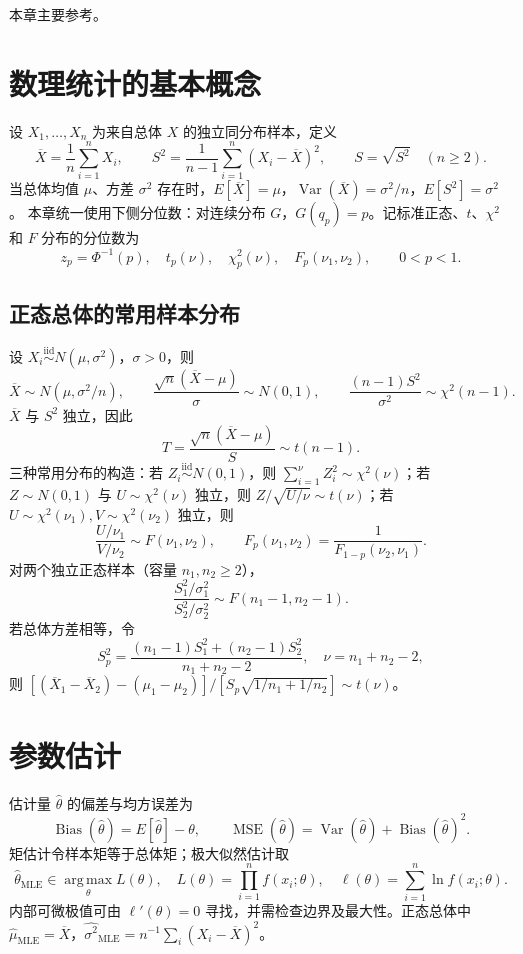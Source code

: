 \documentclass[../main.tex]{subfiles}
\begin{document}
本章主要参考\cite{wasserman}。

\section{数理统计的基本概念}
设 $X_1,\ldots,X_n$ 为来自总体 $X$ 的独立同分布样本，定义
\[
\overline X=\frac1n\sum_{i=1}^nX_i,\qquad
S^2=\frac1{n-1}\sum_{i=1}^n(X_i-\overline X)^2,\qquad S=\sqrt{S^2}\quad(n\ge2).
\]
当总体均值 $\mu$、方差 $\sigma^2$ 存在时，$E[\overline X]=\mu$，$\operatorname{Var}(\overline X)=\sigma^2/n$，$E[S^2]=\sigma^2$。
本章统一使用下侧分位数：对连续分布 $G$，$G(q_p)=p$。记标准正态、$t$、$\chi^2$ 和 $F$ 分布的分位数为
\[
z_p=\Phi^{-1}(p),\quad t_p(\nu),\quad\chi^2_p(\nu),\quad F_p(\nu_1,\nu_2),\qquad0<p<1.
\]
\subsection{正态总体的常用样本分布}
设 $X_i\overset{\mathrm{iid}}\sim N(\mu,\sigma^2)$，$\sigma>0$，则
\[
\overline X\sim N(\mu,\sigma^2/n),\qquad
\frac{\sqrt n(\overline X-\mu)}\sigma\sim N(0,1),\qquad
\frac{(n-1)S^2}{\sigma^2}\sim\chi^2(n-1).
\]
$\overline X$ 与 $S^2$ 独立，因此
\[
T=\frac{\sqrt n(\overline X-\mu)}S\sim t(n-1).
\]
三种常用分布的构造：若 $Z_i\overset{\mathrm{iid}}\sim N(0,1)$，则 $\sum_{i=1}^\nu Z_i^2\sim\chi^2(\nu)$；若 $Z\sim N(0,1)$ 与 $U\sim\chi^2(\nu)$ 独立，则 $Z/\sqrt{U/\nu}\sim t(\nu)$；若 $U\sim\chi^2(\nu_1),V\sim\chi^2(\nu_2)$ 独立，则
\[
\frac{U/\nu_1}{V/\nu_2}\sim F(\nu_1,\nu_2),\qquad
F_p(\nu_1,\nu_2)=\frac1{F_{1-p}(\nu_2,\nu_1)}.
\]
对两个独立正态样本（容量 $n_1,n_2\ge2$），
\[
\frac{S_1^2/\sigma_1^2}{S_2^2/\sigma_2^2}\sim F(n_1-1,n_2-1).
\]
若总体方差相等，令
\[
S_p^2=\frac{(n_1-1)S_1^2+(n_2-1)S_2^2}{n_1+n_2-2},\quad \nu=n_1+n_2-2,
\]
则 $[(\overline X_1-\overline X_2)-(\mu_1-\mu_2)]/[S_p\sqrt{1/n_1+1/n_2}]\sim t(\nu)$。
\section{参数估计}
估计量 $\widehat\theta$ 的偏差与均方误差为
\[
\operatorname{Bias}(\widehat\theta)=E[\widehat\theta]-\theta,\qquad
\operatorname{MSE}(\widehat\theta)=\operatorname{Var}(\widehat\theta)+\operatorname{Bias}(\widehat\theta)^2.
\]
矩估计令样本矩等于总体矩；极大似然估计取
\[
\widehat\theta_{\mathrm{MLE}}\in\operatorname*{arg\,max}_{\theta}L(\theta),\quad
L(\theta)=\prod_{i=1}^nf(x_i;\theta),\quad
\ell(\theta)=\sum_{i=1}^n\ln f(x_i;\theta).
\]
内部可微极值可由 $\ell'(\theta)=0$ 寻找，并需检查边界及最大性。正态总体中 $\widehat\mu_{\mathrm{MLE}}=\overline X$，$\widehat{\sigma^2}_{\mathrm{MLE}}=n^{-1}\sum_i(X_i-\overline X)^2$。
\end{document}
